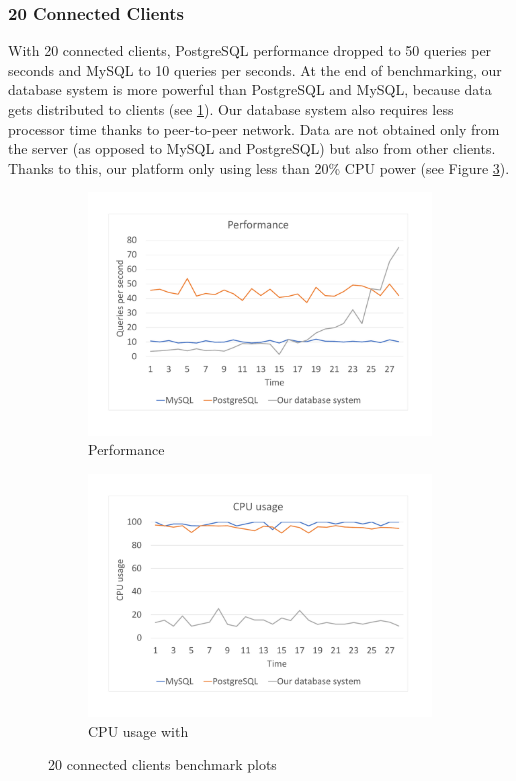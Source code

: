 \subsubsection*{20 Connected Clients}
With 20 connected clients, PostgreSQL performance dropped to 50 queries per seconds and MySQL to 10 queries per seconds. At the end of benchmarking, our database system is more powerful than PostgreSQL and MySQL, because data gets distributed to clients (see \ref{bench20per}). Our database system also requires less processor time thanks to peer-to-peer network. Data are not obtained only from the server (as opposed to MySQL and PostgreSQL) but also from other clients. Thanks to this, our platform only using less than 20\% CPU power (see Figure \ref{bench20cpu}).

\begin{figure}[h]
    \begin{subfigure}{.5\textwidth}
        \centering
        \includegraphics[trim={1.78cm 2cm 2.08cm 1cm},clip,width=1.0\linewidth]{excel/20per.pdf}
        \caption{Performance}
        \label{bench20per}
    \end{subfigure}
    \begin{subfigure}{.5\textwidth}
        \centering
        \includegraphics[trim={1.78cm 2cm 2.08cm 1cm},clip,width=1.0\linewidth]{excel/20cpu.pdf}
        \caption{CPU usage with}
        \label{bench20cpu}
    \end{subfigure}
    \caption{20 connected clients benchmark plots}
\end{figure}


